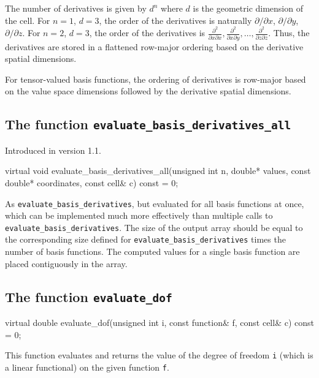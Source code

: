 The number of derivatives is given by $d^n$ where $d$ is the geometric
dimension of the cell. For $n = 1$, $d = 3$, the order of the
derivatives is naturally $\partial/\partial x$, $\partial/\partial y$,
$\partial/\partial z$. For $n = 2$, $d = 3$, the order of the
derivatives is $\frac{\partial^2}{\partial x\partial x},
\frac{\partial^2}{\partial x\partial y}, \ldots,
\frac{\partial^2}{\partial z\partial z}$. Thus, the derivatives are
stored in a flattened row-major ordering based on the derivative
spatial dimensions.

For tensor-valued basis functions, the ordering of derivatives is
row-major based on the value space dimensions followed by the
derivative spatial dimensions.

\subsection{The function \texttt{evaluate\_basis\_derivatives\_all}}
Introduced in version 1.1.

\begin{code}
virtual void
evaluate_basis_derivatives_all(unsigned int n,
                               double* values,
                               const double* coordinates,
                               const cell& c) const = 0;
\end{code}

As \texttt{evaluate\_basis\_derivatives}, but evaluated for all
basis functions at once, which can be implemented much more
effectively than multiple calls to \texttt{evaluate\_basis\_derivatives}.
The size of the output array should be equal to the corresponding size 
defined for \texttt{evaluate\_basis\_derivatives} times the number of
basis functions. The computed values for a single basis function
are placed contiguously in the array.

\subsection{The function \texttt{evaluate\_dof}}

\begin{code}
virtual double evaluate_dof(unsigned int i,
                            const function& f,
                            const cell& c) const = 0;
\end{code}

This function evaluates and returns the value of the degree of freedom
\texttt{i} (which is a linear functional) on the given function
\texttt{f}.
  
